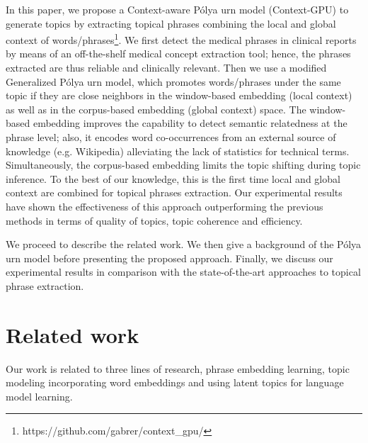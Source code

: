 \documentclass[letterpaper]{article}
\begin{document}
In this paper, we propose a Context-aware P\'{o}lya urn model (Context-GPU) to generate topics by extracting topical phrases combining the local and global context of words/phrases\footnote{https://github.com/gabrer/context\_gpu/}. We first detect the medical phrases in clinical reports by means of an off-the-shelf medical concept extraction tool; hence, the phrases extracted are thus reliable and clinically relevant. Then we use a modified Generalized P\'{o}lya urn model, which promotes words/phrases under the same topic if they are close neighbors in the window-based embedding (local context) as well as in the corpus-based embedding (global context) space. The window-based embedding improves the capability to detect semantic relatedness at the phrase level; also, it encodes word co-occurrences from an external source of knowledge (e.g. Wikipedia) alleviating the lack of statistics for technical terms. Simultaneously, the corpus-based embedding limits the topic shifting during topic inference. To the best of our knowledge, this is the first time local and global context are combined for topical phrases extraction. Our experimental results have shown the effectiveness of this approach outperforming the previous methods in terms of quality of topics, topic coherence and efficiency.

We proceed to describe the related work. We then give a background of the P\'{o}lya urn model before presenting the proposed approach. Finally, we discuss our experimental results in comparison with the state-of-the-art approaches to topical phrase extraction.


\section{Related work}

Our work is related to three lines of research, phrase embedding learning, topic modeling incorporating word embeddings and using latent topics for language model learning.
\end{document}

